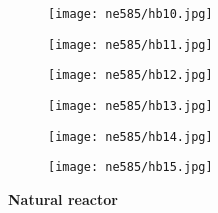 \documentclass[aspectratio=1610,pdftex,dvipsnames,compress,xcolor={dvipsnames}]{beamer}
\begin{document}
\begin{frame}{}
    \begin{figure}
        \centering
        \texttt{[image: ne585/hb10.jpg]}
    \end{figure}
\end{frame}


\begin{frame}{}
    \begin{figure}
        \centering
        \texttt{[image: ne585/hb11.jpg]}
    \end{figure}
\end{frame}


\begin{frame}{}
    \begin{figure}
        \centering
        \texttt{[image: ne585/hb12.jpg]}
    \end{figure}
\end{frame}


\begin{frame}{}
    \begin{figure}
        \centering
        \texttt{[image: ne585/hb13.jpg]}
    \end{figure}
\end{frame}


\begin{frame}{}
    \begin{figure}
        \centering
        \texttt{[image: ne585/hb14.jpg]}
    \end{figure}
\end{frame}


\begin{frame}{}
    \begin{figure}
        \centering
        \texttt{[image: ne585/hb15.jpg]}
    \end{figure}
\end{frame}


\begin{frame}[plain]{}
    \centering\LARGE\textbf{Natural reactor}
\end{frame}
\end{document}
